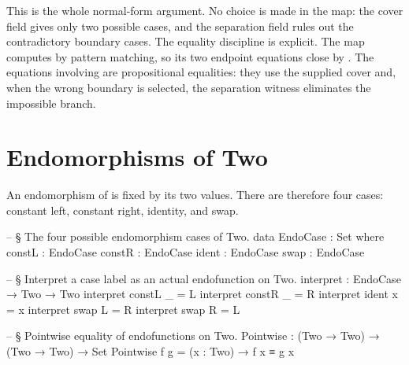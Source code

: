 \documentclass[11pt]{article}
\begin{document}
This is the whole normal-form argument.  No choice is made in the map:
the cover field gives only two possible cases, and the separation field
rules out the contradictory boundary cases.  The equality discipline is
explicit.  The map  computes by pattern matching,
so its two endpoint equations close by .
The equations involving  are propositional
equalities: they use the supplied cover and, when the wrong boundary is
selected, the separation witness eliminates the impossible branch.

\section{Endomorphisms of Two}

An endomorphism of  is fixed by its two values.  There
are therefore four cases: constant left, constant right, identity, and
swap.

\begin{center}
\end{center}

\begin{code}
-- § The four possible endomorphism cases of Two.
data EndoCase : Set where
  constL : EndoCase
  constR : EndoCase
  ident  : EndoCase
  swap   : EndoCase

-- § Interpret a case label as an actual endofunction on Two.
interpret : EndoCase → Two → Two
interpret constL _ = L
interpret constR _ = R
interpret ident  x = x
interpret swap   L = R
interpret swap   R = L

-- § Pointwise equality of endofunctions on Two.
Pointwise : (Two → Two) → (Two → Two) → Set
Pointwise f g = (x : Two) → f x ≡ g x
\end{code}
\end{document}
